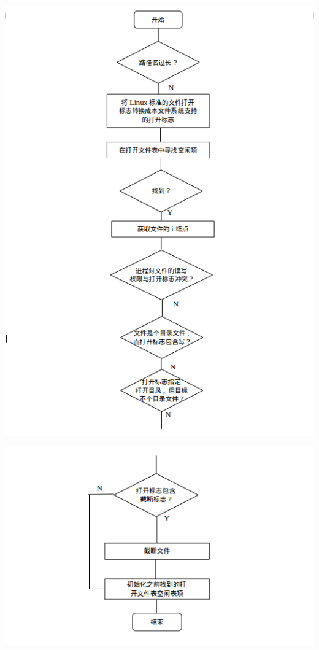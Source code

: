 \documentclass[nofonts, titlepage]{ctexart}
\begin{document}
\begin{itemize}
  \includegraphics[width=15cm]{./images/./open_1.png}

  \includegraphics[width=15cm]{./images/./open_2.png}
  \end{itemize}
\end{document}
